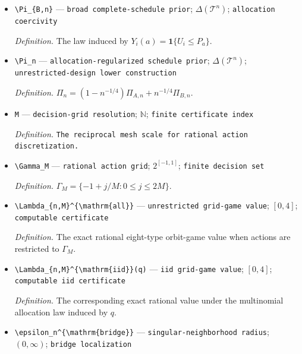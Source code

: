 \documentclass{article}
\begin{document}
\begin{itemize}
  \item \texttt{\textbackslash{}\allowbreak{}Pi\_\allowbreak{}\{B,\allowbreak{}n\}\allowbreak{}} --- \texttt{broad complete-\allowbreak{}schedule prior}; \(\Delta(\mathcal T^n)\); \texttt{allocation coercivity}
  \par\smallskip\noindent\emph{Definition.} The law induced by \(Y_i(a)=\mathbf 1\{U_i\le P_a\}\).
  \item \texttt{\textbackslash{}\allowbreak{}Pi\_\allowbreak{}n} --- \texttt{allocation-\allowbreak{}regularized schedule prior}; \(\Delta(\mathcal T^n)\); \texttt{unrestricted-\allowbreak{}design lower construction}
  \par\smallskip\noindent\emph{Definition.} \(\Pi_n=(1-n^{-1/4})\Pi_{A,n}+n^{-1/4}\Pi_{B,n}\).
  \item \texttt{M} --- \texttt{decision-\allowbreak{}grid resolution}; \(\mathbb N\); \texttt{finite certificate index}
  \par\smallskip\noindent\emph{Definition.} \texttt{The reciprocal mesh scale for rational action discretization.}
  \item \texttt{\textbackslash{}\allowbreak{}Gamma\_\allowbreak{}M} --- \texttt{rational action grid}; \(2^{[-1,1]}\); \texttt{finite decision set}
  \par\smallskip\noindent\emph{Definition.} \(\Gamma_M=\{-1+j/M:0\le j\le2M\}\).
  \item \texttt{\textbackslash{}\allowbreak{}Lambda\_\allowbreak{}\{n,\allowbreak{}M\}\allowbreak{}\textasciicircum{}\{\textbackslash{}\allowbreak{}mathrm\{all\}\allowbreak{}\}\allowbreak{}} --- \texttt{unrestricted grid-\allowbreak{}game value}; \([0,4]\); \texttt{computable certificate}
  \par\smallskip\noindent\emph{Definition.} The exact rational eight-type orbit-game value when actions are restricted to \(\Gamma_M\).
  \item \texttt{\textbackslash{}\allowbreak{}Lambda\_\allowbreak{}\{n,\allowbreak{}M\}\allowbreak{}\textasciicircum{}\{\textbackslash{}\allowbreak{}mathrm\{iid\}\allowbreak{}\}\allowbreak{}(q)} --- \texttt{iid grid-\allowbreak{}game value}; \([0,4]\); \texttt{computable iid certificate}
  \par\smallskip\noindent\emph{Definition.} The corresponding exact rational value under the multinomial allocation law induced by \(q\).
  \item \texttt{\textbackslash{}\allowbreak{}epsilon\_\allowbreak{}n\textasciicircum{}\{\textbackslash{}\allowbreak{}mathrm\{bridge\}\allowbreak{}\}\allowbreak{}} --- \texttt{singular-\allowbreak{}neighborhood radius}; \((0,\infty)\); \texttt{bridge localization}

\end{itemize}
\end{document}
